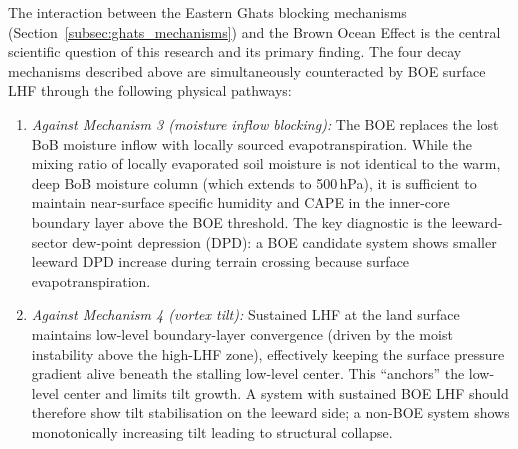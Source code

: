 The interaction between the Eastern Ghats blocking mechanisms
(Section~\ref{subsec:ghats_mechanisms})
and the Brown Ocean Effect is the central scientific question of this
research and its primary finding. The four decay mechanisms described
above are simultaneously counteracted by BOE surface LHF through the
following physical pathways:
\begin{enumerate}
  \item \emph{Against Mechanism 3 (moisture inflow blocking):} The
    BOE replaces the lost BoB moisture inflow with locally sourced
    evapotranspiration. While the mixing ratio of locally evaporated
    soil moisture is not identical to the warm, deep BoB moisture
    column (which extends to 500\,hPa), it is sufficient to maintain
    near-surface specific humidity and CAPE in the inner-core
    boundary layer above the BOE threshold. The key diagnostic is the
    leeward-sector dew-point depression (DPD): a BOE candidate system
    shows smaller leeward DPD increase during terrain crossing
    because surface evapotranspiration.%
  \item \emph{Against Mechanism 4 (vortex tilt):} Sustained LHF at
    the land surface maintains low-level boundary-layer convergence
    (driven by the moist instability above the high-LHF zone),
    effectively keeping the surface pressure gradient alive beneath
    the stalling low-level center. This ``anchors'' the low-level
    center and limits tilt growth. A system with sustained BOE LHF
    should therefore show tilt stabilisation on the leeward side; a
    non-BOE system shows monotonically increasing tilt leading to
    structural collapse.


\end{enumerate}
